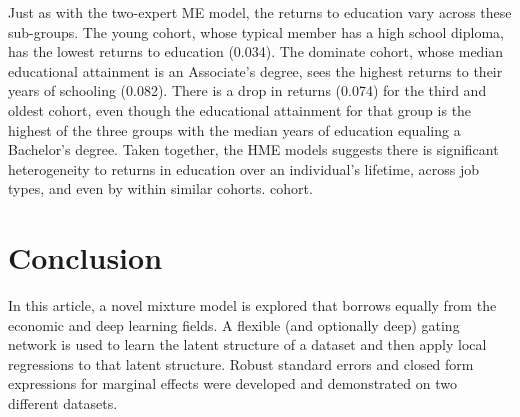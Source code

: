 \documentclass[12pt]{article}
\begin{document}
Just as with the two-expert ME model, the returns to education vary across these 
sub-groups. The young cohort, whose typical member has a high school diploma, has
the lowest returns to education (0.034). The dominate cohort, whose median educational attainment 
is an Associate's degree, sees the highest returns to their years of schooling (0.082).
There is a drop in returns (0.074) for the third and oldest cohort, even though the educational
attainment for that group is the highest of the three groups with the median years of
education equaling a Bachelor's degree. Taken together, the HME models
suggests there is significant heterogeneity to returns in education over an
individual's lifetime, across job types, and even by within similar cohorts.
cohort. 

\section{Conclusion} \label{sec:Conclusion}

In this article, a novel mixture model is explored that borrows equally from the
economic and deep learning fields. A flexible (and optionally deep) gating network
is used to learn the latent structure of a dataset and then apply local
regressions to that latent structure. Robust standard errors and closed form expressions
for marginal effects were developed and demonstrated on two different datasets. 
\end{document}
